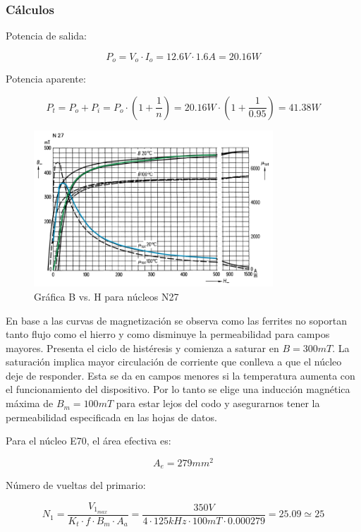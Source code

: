 \subsubsection{Cálculos}

Potencia de salida:

$$ P_{o}=V_{o}\cdot I_{o}=12.6V\cdot 1.6A=20.16W $$

Potencia aparente: 

$$P_t=P_o+P_i=P_o\cdot\left(1+\frac{1}{n}\right)=20.16W\cdot\left(1+\frac{1}{0.95}\right)=41.38W  $$

\begin{figure}[ht]
    \centering
    \includegraphics[width=0.8\textwidth]{images/diseno-trafos-kike/tabla_bh_kike.png}
    \caption{Gráfica B vs. H para núcleos N27}
    \label{fig:grafica-b-h}
\end{figure}

En base a las curvas de magnetización se observa como las ferrites no soportan tanto flujo como el hierro y como disminuye la permeabilidad para campos mayores.  
Presenta el ciclo de histéresis y comienza a saturar en $B=300mT$. 
La saturación implica mayor circulación de corriente que conlleva a que el núcleo deje de responder. 
Esta se da en campos menores si la temperatura aumenta con el funcionamiento del dispositivo. 
Por lo tanto se elige una inducción magnética máxima de $B_{m}=100mT$ para estar lejos del codo y asegurarnos tener la permeabilidad especificada en las hojas de datos. 

Para el núcleo E70, el área efectiva es: 

$$ A_{e}=279{mm}^{2} $$

Número de vueltas del primario:

$$ N_{1}=\frac{V_{1_{max}}}{K_{t}\cdot f\cdot B_{m}\cdot A_{a}}=\frac{350V}{4\cdot 125kHz\cdot 100mT\cdot 0.000279}=25.09\simeq 25 $$

